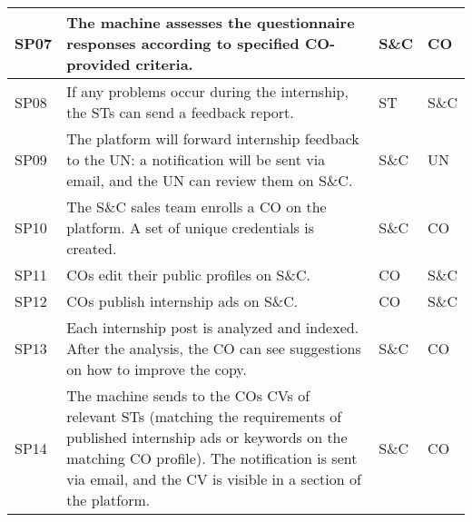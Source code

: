 \begin{longtable}{|l|p{}|l|l|}
    \hline
    SP07               & The machine assesses the questionnaire responses according to specified CO-provided criteria.                                                                                                                                                         & S\&C                & CO                \\
    \hline
    SP08               & If any problems occur during the internship, the STs can send a feedback report.                                                                                                                                                                      & ST                  & S\&C              \\
    \hline
    SP09               & The platform will forward internship feedback to the UN: a notification will be sent via email, and the UN can review them on S\&C.                                                                                                                   & S\&C                & UN                \\
    \hline
    SP10               & The S\&C sales team enrolls a CO on the platform. A set of unique credentials is created.                                                                                                                                                             & S\&C                & CO                \\
    \hline
    SP11               & COs edit their public profiles on S\&C.                                                                                                                                                                                                               & CO                  & S\&C              \\
    \hline
    SP12               & COs publish internship ads on S\&C.                                                                                                                                                                                                                   & CO                  & S\&C              \\
    \hline
    SP13               & Each internship post is analyzed and indexed. After the analysis, the CO can see suggestions on how to improve the copy.                                                                                                                              & S\&C                & CO                \\
    \hline
    SP14               & The machine sends to the COs CVs of relevant STs (matching the requirements of published internship ads or keywords on the matching CO profile). The notification is sent via email, and the CV is visible in a section of the platform.              & S\&C                & CO                \\

\end{longtable}

